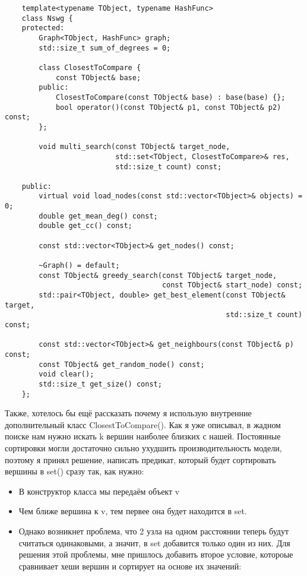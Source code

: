 \begin{verbatim}
    template<typename TObject, typename HashFunc>
    class Nswg {
    protected:
        Graph<TObject, HashFunc> graph;
        std::size_t sum_of_degrees = 0;

        class ClosestToCompare {
            const TObject& base;
        public:
            ClosestToCompare(const TObject& base) : base(base) {};
            bool operator()(const TObject& p1, const TObject& p2) const;
        };

        void multi_search(const TObject& target_node, 
                          std::set<TObject, ClosestToCompare>& res, 
                          std::size_t count) const;

    public:
        virtual void load_nodes(const std::vector<TObject>& objects) = 0;
        double get_mean_deg() const;
        double get_cc() const;

        const std::vector<TObject>& get_nodes() const;

        ~Graph() = default;
        const TObject& greedy_search(const TObject& target_node, 
                                     const TObject& start_node) const;
        std::pair<TObject, double> get_best_element(const TObject& target, 
                                                    std::size_t count) const;

        const std::vector<TObject>& get_neighbours(const TObject& p) const;
        const TObject& get_random_node() const;
        void clear();
        std::size_t get_size() const;
    };
\end{verbatim}

Также, хотелось бы ещё рассказать почему я использую внутренние дополнительный класс ClosestToCompare(). 
Как я уже описывал, в жадном поиске нам нужно искать k вершин наиболее близких с нашей.
Постоянные сортировки могли достаточно сильно ухудшить производительность модели, поэтому я принял решение, 
написать предикат, который будет сортировать вершины в set() сразу так, как нужно:
\begin{itemize}
    \item В конструктор класса мы передаём объект v
    \item Чем ближе вершина к v, тем первее она будет находится в set.
    \item Однако возникнет проблема, что 2 узла на одном расстоянии теперь будут считаться
    одинаковыми, а значит, в set добавится только один из них. Для решения этой проблемы, мне пришлось
    добавить второе условие, котороые сравнивает хеши вер\-шин и сортирует на основе их значений:
\end{itemize}

